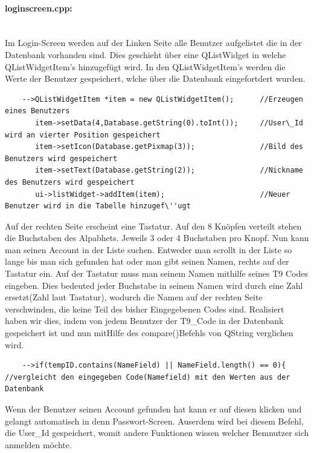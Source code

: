 \documentclass[11pt,a4paper]{article} %
\begin{document}
\paragraph{loginscreen.cpp:} $\;$ \\
	Im Login-Screen werden auf der Linken Seite alle Benutzer aufgelistet die in der Datenbank vorhanden sind. Dies geschieht über eine QListWidget in welche QListWidgetItem's hinzugefügt wird.
	In den QListWidgetItem's werden die Werte der Benutzer gespeichert, wlche über die Datenbank eingefortdert wurden. 
	\begin{frame}

\begin{lstlisting}
	-->QListWidgetItem *item = new QListWidgetItem();      //Erzeugen eines Benutzers
       item->setData(4,Database.getString(0).toInt());     //User\_Id wird an vierter Position gespeichert
       item->setIcon(Database.getPixmap(3));               //Bild des Benutzers wird gespeichert
       item->setText(Database.getString(2));               //Nickname des Benutzers wird gespeichert
       ui->listWidget->addItem(item);                      //Neuer Benutzer wird in die Tabelle hinzugef\''ugt
       \end{lstlisting}
\end{frame}
\par
	Auf der rechten Seite erscheint eine Tastatur. Auf den 8 Knöpfen verteilt stehen die Buchstaben des Alpabhets. Jeweils 3 oder 4 Buchstaben pro Knopf.
	Nun kann man seinen Account in der Liste suchen. Entweder man scrollt in der Liste so lange bis man sich gefunden hat oder man gibt seinen Namen, rechts auf der Tastatur ein.
	Auf der Tastatur muss man seinem Namen mithilfe seines T9 Codes eingeben. Dies bedeuted jeder Buchstabe in seinem Namen wird durch eine Zahl ersetzt(Zahl laut Tastatur), 
	wodurch die Namen auf der rechten Seite verschwinden, die keine Teil des bisher Eingegebenen Codes sind.
	Realisiert haben wir dies, indem von jedem Benutzer der T9\_Code in der Datenbank gespeichert ist und nun mitHilfe des compare()Befehls von QString verglichen wird.
	\begin{frame}

\begin{lstlisting}
	-->if(tempID.contains(NameField) || NameField.length() == 0){      //vergleicht den eingegeben Code(Namefield) mit den Werten aus der Datenbank  
	\end{lstlisting}
\end{frame}
\par	
	Wenn der Benutzer seinen Account gefunden hat kann er auf diesen klicken und gelangt automatisch in denn Passwort-Screen.
	Auserdem wird bei diesem Befehl, die User\_Id gespeichert, womit andere Funktionen wissen welcher Bemnutzer sich anmelden möchte.	
\par
\end{document}

